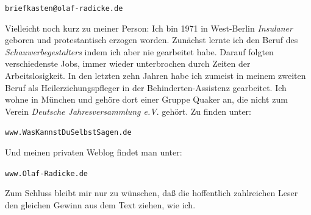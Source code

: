 \begin{center}
\texttt{briefkasten@olaf-radicke.de}
\end{center}

Vielleicht noch kurz zu meiner Person: Ich bin 1971 in West-Berlin
\textit{Insulaner} geboren und protestantisch erzogen worden. Zunächst lernte
ich den Beruf des \textit{Schauwerbegestalters} indem ich aber nie gearbeitet
habe. Darauf folgten verschiedenste Jobs, immer wieder unterbrochen durch Zeiten
der Arbeitslosigkeit. In den letzten zehn Jahren habe ich zumeist in meinem
zweiten Beruf als Heilerziehungspfleger in der Behinderten-Assistenz gearbeitet.
Ich wohne in München und gehöre dort einer Gruppe Quaker an, die nicht zum
Verein \textit{Deutsche Jahresversammlung e.V}. gehört. Zu finden unter:

\begin{center}
\texttt{www.WasKannstDuSelbstSagen.de}
\end{center}

Und meinen privaten Weblog findet man unter:

\begin{center}
\texttt{www.Olaf-Radicke.de}
\end{center}

Zum Schluss bleibt mir nur zu wünschen, daß die hoffentlich zahlreichen Leser
den gleichen Gewinn aus dem Text ziehen, wie ich.


